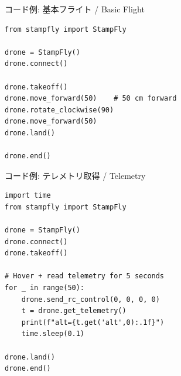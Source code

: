 \documentclass[aspectratio=169, 14pt]{beamer}
\begin{document}
\begin{frame}[fragile]{コード例: 基本フライト / Basic Flight}
  \begin{lstlisting}[style=sfpython, title={flight\_basic.py}]
from stampfly import StampFly

drone = StampFly()
drone.connect()

drone.takeoff()
drone.move_forward(50)    # 50 cm forward
drone.rotate_clockwise(90)
drone.move_forward(50)
drone.land()

drone.end()
  \end{lstlisting}
\end{frame}

\begin{frame}[fragile]{コード例: テレメトリ取得 / Telemetry}
  \begin{lstlisting}[style=sfpython, title={flight\_telemetry.py}]
import time
from stampfly import StampFly

drone = StampFly()
drone.connect()
drone.takeoff()

# Hover + read telemetry for 5 seconds
for _ in range(50):
    drone.send_rc_control(0, 0, 0, 0)
    t = drone.get_telemetry()
    print(f"alt={t.get('alt',0):.1f}")
    time.sleep(0.1)

drone.land()
drone.end()
  \end{lstlisting}
\end{frame}
\end{document}
